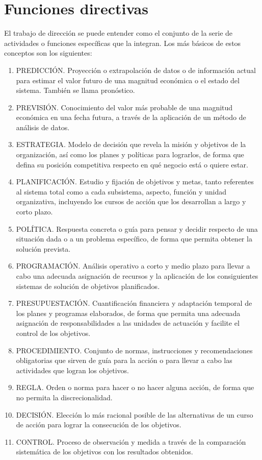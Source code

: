 \documentclass[
]{krantz}
\providecommand{\tightlist}{%
  \setlength{\itemsep}{0pt}\setlength{\parskip}{0pt}}
\begin{document}
\hypertarget{funciones-directivas}{%
\section{Funciones directivas}\label{funciones-directivas}}

El trabajo de dirección se puede entender como el conjunto de la serie de actividades o funciones específicas que la integran. Los más básicos de estos conceptos son los siguientes:

\begin{enumerate}
\def\labelenumi{\arabic{enumi}.}
\tightlist
\item
  PREDICCIÓN. Proyección o extrapolación de datos o de información actual para estimar el valor futuro de una magnitud económica o el estado del sistema. También se llama pronóstico.
\item
  PREVISIÓN. Conocimiento del valor más probable de una magnitud económica en una fecha futura, a través de la aplicación de un método de análisis de datos.
\item
  ESTRATEGIA. Modelo de decisión que revela la misión y objetivos de la organización, así como los planes y políticas para lograrlos, de forma que defina su posición competitiva respecto en qué negocio está o quiere estar.
\item
  PLANIFICACIÓN. Estudio y fijación de objetivos y metas, tanto referentes al sistema total como a cada subsistema, aspecto, función y unidad organizativa, incluyendo los cursos de acción que los desarrollan a largo y corto plazo.
\item
  POLÍTICA. Respuesta concreta o guía para pensar y decidir respecto de una situación dada o a un problema específico, de forma que permita obtener la solución prevista.
\item
  PROGRAMACIÓN. Análisis operativo a corto y medio plazo para llevar a cabo una adecuada asignación de recursos y la aplicación de los consiguientes sistemas de solución de objetivos planificados.
\item
  PRESUPUESTACIÓN. Cuantificación financiera y adaptación temporal de los planes y programas elaborados, de forma que permita una adecuada asignación de responsabilidades a las unidades de actuación y facilite el control de los objetivos.
\item
  PROCEDIMIENTO. Conjunto de normas, instrucciones y recomendaciones obligatorias que sirven de guía para la acción o para llevar a cabo las actividades que logran los objetivos.
\item
  REGLA. Orden o norma para hacer o no hacer alguna acción, de forma que no permita la discrecionalidad.
\item
  DECISIÓN. Elección lo más racional posible de las alternativas de un curso de acción para lograr la consecución de los objetivos.
\item
  CONTROL. Proceso de observación y medida a través de la comparación sistemática de los objetivos con los resultados obtenidos.
\end{enumerate}
\end{document}
